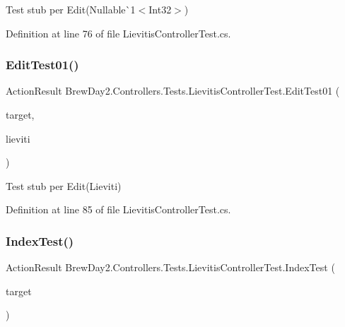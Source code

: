 Test stub per Edit(Nullable\`{}1$<$Int32$>$)



Definition at line 76 of file Lievitis\+Controller\+Test.\+cs.

\mbox{\label{class_brew_day2_1_1_controllers_1_1_tests_1_1_lievitis_controller_test_a293d08f28b0adc7d5bab68ca5395b390}} 
\subsubsection{\texorpdfstring{Edit\+Test01()}{EditTest01()}}
{\footnotesize\ttfamily Action\+Result Brew\+Day2.\+Controllers.\+Tests.\+Lievitis\+Controller\+Test.\+Edit\+Test01 (\begin{DoxyParamCaption}\item[{\mbox{[}\+Pex\+Assume\+Under\+Test\mbox{]} \mbox{\hyperlink{class_brew_day2_1_1_controllers_1_1_lievitis_controller}{Lievitis\+Controller}}}]{target,  }\item[{\mbox{\hyperlink{class_brew_day2_1_1_models_1_1_lieviti}{Lieviti}}}]{lieviti }\end{DoxyParamCaption})}



Test stub per Edit(\+Lieviti)



Definition at line 85 of file Lievitis\+Controller\+Test.\+cs.

\mbox{\label{class_brew_day2_1_1_controllers_1_1_tests_1_1_lievitis_controller_test_ac77932c26b8f4edc8774ef8545fad7d4}} 
\subsubsection{\texorpdfstring{Index\+Test()}{IndexTest()}}
{\footnotesize\ttfamily Action\+Result Brew\+Day2.\+Controllers.\+Tests.\+Lievitis\+Controller\+Test.\+Index\+Test (\begin{DoxyParamCaption}\item[{\mbox{[}\+Pex\+Assume\+Under\+Test\mbox{]} \mbox{\hyperlink{class_brew_day2_1_1_controllers_1_1_lievitis_controller}{Lievitis\+Controller}}}]{target }\end{DoxyParamCaption})}



